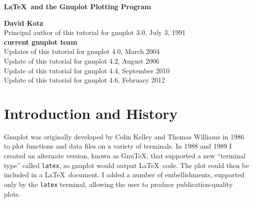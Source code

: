 %
%
%
%







\begin{titlepage}

\begin{center}
{\Large \bf \LaTeX\ and the Gnuplot Plotting Program}

\vskip2cm

{\bf David Kotz} \\[0.4cm]
Principal author of this tutorial for gnuplot 3.0, July 3, 1991 \\[1.0cm]

{\bf current gnuplot team} \\[0.4cm]
Updates of this tutorial for gnuplot 4.0, March 2004 \\
Update of this tutorial for gnuplot 4.2, August 2006 \\
Update of this tutorial for gnuplot 4.4, September 2010 \\
Update of this tutorial for gnuplot 4.6, February 2012

\vskip2cm


\end{center}

\vfil
\vfil
\tableofcontents
\vfil

\end{titlepage}


\pagestyle{myheadings}

\currentspace %

\section{Introduction and History}

Gnuplot was originally developed by Colin Kelley and Thomas Williams
in 1986 to plot functions and data files on a variety of terminals.
In 1988 and 1989 I created an alternate version, known as Gnu\TeX,
that supported a new ``terminal type'' called {\tt latex}, so gnuplot
would output \LaTeX\ code. The plot could then be included in a
\LaTeX\ document. I added a number of embellishments, supported only
by the {\tt latex} terminal, allowing the user to produce
publication-quality plots.

